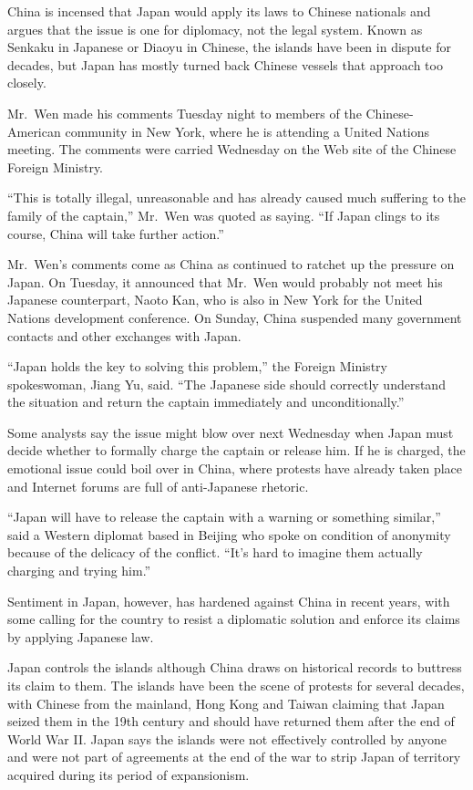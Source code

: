 ﻿\documentclass[12pt]{article}
\begin{document}
China is incensed that Japan would apply its laws to Chinese nationals and argues that the issue is
one for diplomacy, not the legal system. Known as Senkaku in Japanese or Diaoyu in Chinese, the
islands have been in dispute for decades, but Japan has mostly turned back Chinese vessels that
approach too closely.

Mr.~Wen made his comments Tuesday night to members of the Chinese-American community in New York,
where he is attending a United Nations meeting. The comments were carried Wednesday on the Web site
of the Chinese Foreign Ministry.

``This is totally illegal, unreasonable and has already caused much suffering to the family of the
captain,'' Mr.~Wen was quoted as saying. ``If Japan clings to its course, China will take further
action.''

Mr.~Wen's comments come as China as continued to ratchet up the pressure on Japan. On Tuesday, it
announced that Mr.~Wen would probably not meet his Japanese counterpart, Naoto Kan, who is also in
New York for the United Nations development conference. On Sunday, China suspended many government
contacts and other exchanges with Japan.

``Japan holds the key to solving this problem,'' the Foreign Ministry spokeswoman, Jiang Yu, said.
``The Japanese side should correctly understand the situation and return the captain immediately and
unconditionally.''

Some analysts say the issue might blow over next Wednesday when Japan must decide whether to
formally charge the captain or release him. If he is charged, the emotional issue could boil over in
China, where protests have already taken place and Internet forums are full of anti-Japanese
rhetoric.

``Japan will have to release the captain with a warning or something similar,'' said a Western
diplomat based in Beijing who spoke on condition of anonymity because of the delicacy of the
conflict. ``It's hard to imagine them actually charging and trying him.''

Sentiment in Japan, however, has hardened against China in recent years, with some calling for the
country to resist a diplomatic solution and enforce its claims by applying Japanese law.

Japan controls the islands although China draws on historical records to buttress its claim to them.
The islands have been the scene of protests for several decades, with Chinese from the mainland,
Hong Kong and Taiwan claiming that Japan seized them in the 19th century and should have returned
them after the end of World War II. Japan says the islands were not effectively controlled by anyone
and were not part of agreements at the end of the war to strip Japan of territory acquired during
its period of expansionism.
\end{document}
